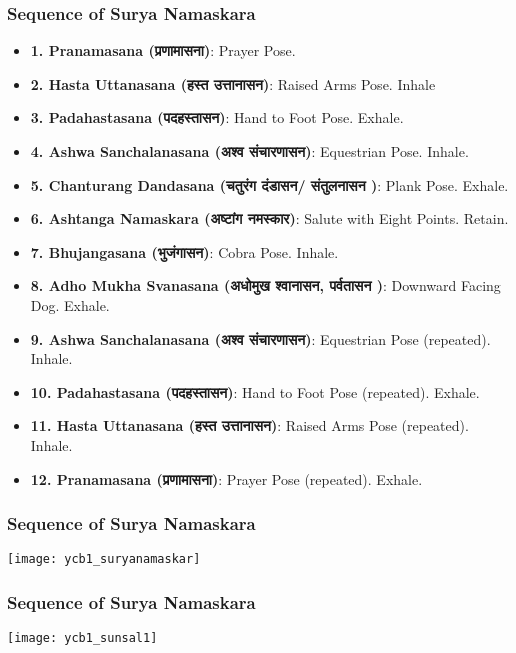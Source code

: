 \begin{frame}[fragile]\frametitle{Sequence of Surya Namaskara}

      \begin{itemize}
        \item \textbf{1. Pranamasana (प्रणामासना)}: Prayer Pose.
        \item \textbf{2. Hasta Uttanasana (हस्त उत्तानासन)}: Raised Arms Pose. Inhale
        \item \textbf{3. Padahastasana (पदहस्तासन)}: Hand to Foot Pose. Exhale.
        \item \textbf{4. Ashwa Sanchalanasana (अश्व संचारणासन)}: Equestrian Pose. Inhale.
        \item \textbf{5. Chanturang Dandasana (चतुरंग दंडासन/ संतुलनासन )}: Plank Pose. Exhale.
        \item \textbf{6. Ashtanga Namaskara (अष्टांग नमस्कार)}: Salute with Eight Points. Retain.
        \item \textbf{7. Bhujangasana (भुजंगासन)}: Cobra Pose. Inhale.
        \item \textbf{8. Adho Mukha Svanasana (अधोमुख श्वानासन, पर्वतासन )}: Downward Facing Dog. Exhale.
        \item \textbf{9. Ashwa Sanchalanasana (अश्व संचारणासन)}: Equestrian Pose (repeated). Inhale.
        \item \textbf{10. Padahastasana (पदहस्तासन)}: Hand to Foot Pose (repeated). Exhale.
        \item \textbf{11. Hasta Uttanasana (हस्त उत्तानासन)}: Raised Arms Pose (repeated). Inhale.
        \item \textbf{12. Pranamasana (प्रणामासना)}: Prayer Pose (repeated). Exhale.
      \end{itemize}
 
\end{frame}


\begin{frame}[fragile]\frametitle{Sequence of Surya Namaskara}

        \begin{center}
        \texttt{[image: ycb1\_suryanamaskar]}
        \end{center}	

\end{frame}

\begin{frame}[fragile]\frametitle{Sequence of Surya Namaskara}

        \begin{center}
        \texttt{[image: ycb1\_sunsal1]}
		
        \end{center}	
		

\end{frame}

